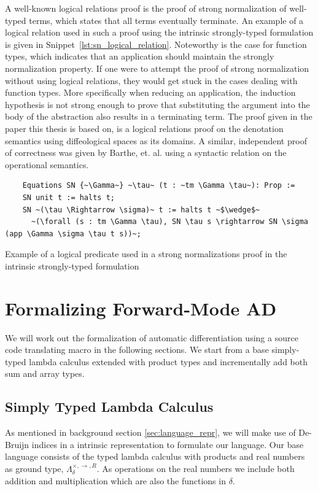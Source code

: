 \documentclass[11pt, final]{article}
\begin{document}
A well-known logical relations proof is the proof of strong normalization of well-typed terms, which states that all terms eventually terminate.
An example of a logical relation used in such a proof using the intrinsic strongly-typed formulation is given in Snippet~\ref{lst:sn_logical_relation}.
Noteworthy is the case for function types, which indicates that an application should maintain the strongly normalization property.
If one were to attempt the proof of strong normalization without using logical relations, they would get stuck in the cases dealing with function types.
More specifically when reducing an application, the induction hypothesis is not strong enough to prove that substituting the argument into the body of the abstraction also results in a terminating term.
The proof given in the paper this thesis is based on, is a logical relations proof on the denotation semantics using diffeological spaces as its domains\cite{huot2020correctness}.
A similar, independent proof of correctness was given by Barthe, et. al.\cite{barthe2020versatility} using a syntactic relation on the operational semantics.

\begin{listing}
  \begin{verbatim}
    Equations SN {~\Gamma~} ~\tau~ (t : ~tm \Gamma \tau~): Prop :=
    SN unit t := halts t;
    SN ~(\tau \Rightarrow \sigma)~ t := halts t ~$\wedge$~
      ~(\forall (s : tm \Gamma \tau), SN \tau s \rightarrow SN \sigma (app \Gamma \sigma \tau t s))~;
  \end{verbatim}
  \caption{Example of a logical predicate used in a strong normalizations proof in the intrinsic strongly-typed formulation}
  \label{lst:sn_logical_relation}
\end{listing}

\section{Formalizing Forward-Mode AD}
  We will work out the formalization of automatic differentiation using a source code translating macro in the following sections.
  We start from a base simply-typed lambda calculus extended with product types and incrementally add both sum and array types.

  \subsection{Simply Typed Lambda Calculus}
  As mentioned in background section \ref{sec:language_repr}, we will make use of De-Bruijn indices in a intrinsic representation to formulate our language.
  Our base language consists of the typed lambda calculus with products and real numbers as ground type, $\Lambda_{\delta}^{\times, \rightarrow, R}$.
  As operations on the real numbers we include both addition and multiplication which are also the functions in $\delta$.
\end{document}
